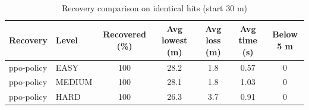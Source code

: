 \begin{table}[h]
\centering
\caption{Recovery comparison on identical hits (start 30 m)}
\begin{tabular}{llccccc}
\hline
Recovery & Level & Recovered (\%) & Avg lowest (m) & Avg loss (m) & Avg time (s) & Below 5 m \\
\hline
ppo-policy & EASY & 100 & 28.2 & 1.8 & 0.57 & 0 \\
ppo-policy & MEDIUM & 100 & 28.1 & 1.8 & 1.03 & 0 \\
ppo-policy & HARD & 100 & 26.3 & 3.7 & 0.91 & 0 \\
\hline
\end{tabular}
\end{table}
